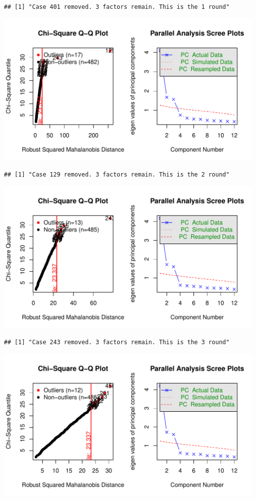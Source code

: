 \documentclass{article}\usepackage[]{graphicx}\usepackage[]{color}
\makeatletter
\def\maxwidth{ %
  \ifdim\Gin@nat@width>\linewidth
    \linewidth
  \else
    \Gin@nat@width
  \fi
}
\newenvironment{kframe}{%
 \def\at@end@of@kframe{}%
 \ifinner\ifhmode%
  \def\at@end@of@kframe{\end{minipage}}%
  \begin{minipage}{\columnwidth}%
 \fi\fi%
 \def\FrameCommand##1{\hskip\@totalleftmargin \hskip-\fboxsep
 \colorbox{shadecolor}{##1}\hskip-\fboxsep
     \hskip-\linewidth \hskip-\@totalleftmargin \hskip\columnwidth}%
 \MakeFramed {\advance\hsize-\width
   \@totalleftmargin\z@ \linewidth\hsize
   \@setminipage}}%
 {\par\unskip\endMakeFramed%
 \at@end@of@kframe}
\newenvironment{knitrout}{}{} %
\makeatother
\begin{document}
\begin{knitrout}
\begin{kframe}\begin{verbatim}
## [1] "Case 401 removed. 3 factors remain. This is the 1 round"
\end{verbatim}
\end{kframe}
\includegraphics[width=\maxwidth]{figure/unnamed-chunk-10-2} 
\begin{kframe}\begin{verbatim}
## [1] "Case 129 removed. 3 factors remain. This is the 2 round"
\end{verbatim}
\end{kframe}
\includegraphics[width=\maxwidth]{figure/unnamed-chunk-10-3} 
\begin{kframe}\begin{verbatim}
## [1] "Case 243 removed. 3 factors remain. This is the 3 round"
\end{verbatim}
\end{kframe}
\includegraphics[width=\maxwidth]{figure/unnamed-chunk-10-4} 

\end{knitrout}
\end{document}
